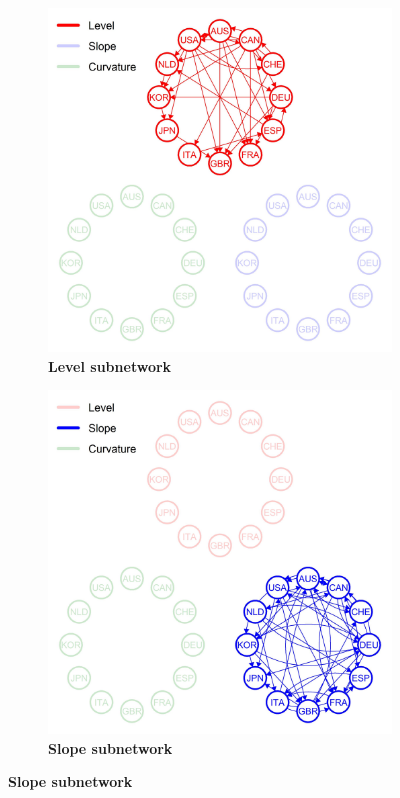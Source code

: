 \documentclass[12pt,bibliography=totoc]{article}
\begin{document}
\begin{figure}[H]

  \begin{subfigure}[t]{.5\textwidth}
    \centering
    \includegraphics[width=\linewidth]{levelOnly_1998-09-30_2021-12-29_TY_fix}
    \caption{\textbf{Level subnetwork}}
\label{fig:levelSubnetwork}
  \end{subfigure}
  \hfill
  \begin{subfigure}[t]{.5\textwidth}
    \centering
    \includegraphics[width=\linewidth]{slopeOnly_1998-09-30_2021-12-29_TY_fix}
    \caption{\textbf{Slope subnetwork}}
\label{fig:slopeSubnetwork}
  \end{subfigure}


\end{figure}
\end{document}

